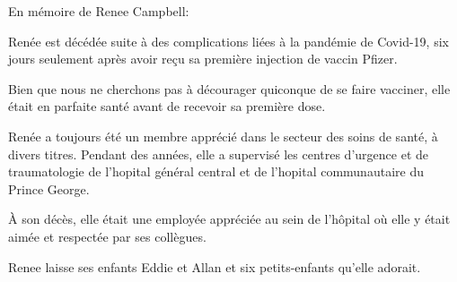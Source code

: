 En mémoire de Renee Campbell:

Renée est décédée suite à des complications liées à la pandémie de Covid-19, six
jours seulement après avoir reçu sa première injection de vaccin Pfizer.

Bien que nous ne cherchons pas à décourager quiconque de se faire vacciner, elle
était en parfaite santé avant de recevoir sa première dose.

Renée a toujours été un membre apprécié dans le secteur des soins de santé, à
divers titres. Pendant des années, elle a supervisé les centres d'urgence et de
traumatologie de l'hopital général central et de l'hopital communautaire du
Prince George.

À son décès, elle était une employée appréciée au sein de l'hôpital où elle y
était aimée et respectée par ses collègues.

Renee laisse ses enfants Eddie et Allan et six petits-enfants qu'elle adorait.

